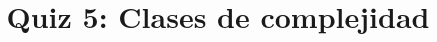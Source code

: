 \documentclass{doc}
\title{Quiz 5: Clases de complejidad}
\begin{document}
\makedocheader
\quizidentification

\quizback
\end{document}
